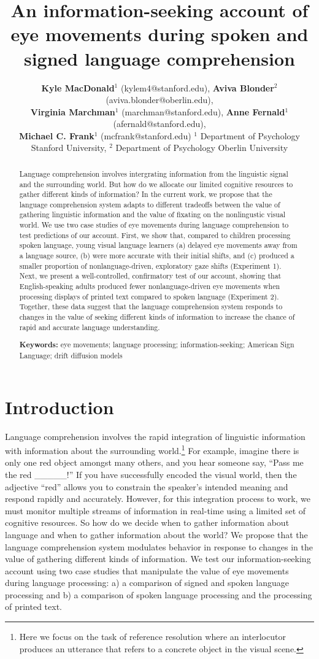 \documentclass[10pt, letterpaper]{article}
\title{An information-seeking account of eye movements during spoken and signed
language comprehension}
\author{ {\large \bf Kyle MacDonald}$^1$ (kylem4@stanford.edu), {\large \bf Aviva Blonder}$^2$ (aviva.blonder@oberlin.edu), \\  {\large \bf Virginia Marchman}$^1$ (marchman@stanford.edu), {\large \bf Anne Fernald}$^1$ (afernald@stanford.edu), \\ {\large \bf Michael C. Frank}$^1$ (mcfrank@stanford.edu)  \AND
   $^1$ Department of Psychology Stanford University, $^2$ Department of Psychology Oberlin University}
\begin{document}
\maketitle

\begin{abstract}
Language comprehension involves intergrating information from the
linguistic signal and the surrounding world. But how do we allocate our
limited cognitive resources to gather different kinds of information? In
the current work, we propose that the language comprehension system
adapts to different tradeoffs between the value of gathering linguistic
information and the value of fixating on the nonlingustic visual world.
We use two case studies of eye movements during language comprehension
to test predictions of our account. First, we show that, compared to
children processing spoken language, young visual language learners (a)
delayed eye movements away from a language source, (b) were more
accurate with their initial shifts, and (c) produced a smaller
proportion of nonlanguage-driven, exploratory gaze shifts (Experiment
1). Next, we present a well-controlled, confirmatory test of our
account, showing that English-speaking adults produced fewer
nonlanguage-driven eye movements when processing displays of printed
text compared to spoken language (Experiment 2). Together, these data
suggest that the language comprehension system responds to changes in
the value of seeking different kinds of information to increase the
chance of rapid and accurate language understanding.

\textbf{Keywords:}
eye movements; language processing; information-seeking; American Sign
Language; drift diffusion models
\end{abstract}

\section{Introduction}\label{introduction}

Language comprehension involves the rapid integration of linguistic
information with information about the surrounding world.\footnote{Here
  we focus on the task of reference resolution where an interlocutor
  produces an utterance that refers to a concrete object in the visual
  scene.} For example, imagine there is only one red object amongst many
others, and you hear someone say, ``Pass me the red \_\_\_\_\_!'' If you
have successfully encoded the visual world, then the adjective ``red''
allows you to constrain the speaker's intended meaning and respond
rapidly and accurately. However, for this integration process to work,
we must monitor multiple streams of information in real-time using a
limited set of cognitive resources. So how do we decide when to gather
information about language and when to gather information about the
world? We propose that the language comprehension system modulates
behavior in response to changes in the value of gathering different
kinds of information. We test our information-seeking account using two
case studies that manipulate the value of eye movements during language
processing: a) a comparison of signed and spoken language processing and
b) a comparison of spoken language processing and the processing of
printed text.
\end{document}
